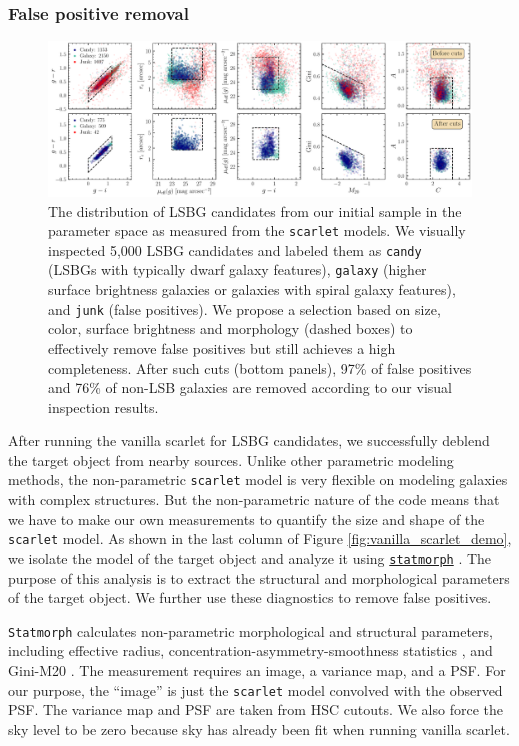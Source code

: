 \documentclass[twocolumn,astrosymb,twocolappendix]{aastex631}
\newcommand{\code}[1]{\texttt{#1}}
\begin{document}
\begin{CJK*}{UTF8}{gbsn}
\subsubsection{False positive removal}\label{sec:non-par-measurement}

\begin{figure}
	\vbox{
		\centering
		\includegraphics[width=1.0\linewidth]{deblending_cuts.pdf}
	}
	\caption{The distribution of LSBG candidates from our initial sample in the parameter space as measured from the \code{scarlet} models. We visually inspected 5,000 LSBG candidates and labeled them as \code{candy} (LSBGs with typically dwarf galaxy features), \code{galaxy} (higher surface brightness galaxies or galaxies with spiral galaxy features), and \code{junk} (false positives). We propose a selection based on size, color, surface brightness and morphology (dashed boxes) to effectively remove false positives but still achieves a high completeness. After such cuts (bottom panels), 97\% of false positives and 76\% of non-LSB galaxies are removed according to our visual inspection results. 
	}
	\label{fig:deblending_cuts}
\end{figure}

After running the vanilla scarlet for LSBG candidates, we successfully deblend the target object from nearby sources. Unlike other parametric modeling methods, the non-parametric \code{scarlet} model is very flexible on modeling galaxies with complex structures. But the non-parametric nature of the code means that we have to make our own measurements to quantify the size and shape of the \code{scarlet} model. As shown in the last column of Figure \ref{fig:vanilla_scarlet_demo}, we isolate the model of the target object and analyze it using \href{https://statmorph.readthedocs.io/en/latest/}{\code{statmorph}} \citep{statmorph}. The purpose of this analysis is to extract the structural and morphological parameters of the target object. We further use these diagnostics to remove false positives. 

\code{Statmorph} calculates non-parametric morphological and structural parameters, including effective radius, concentration-asymmetry-smoothness statistics \citep[CAS,][]{Conselice2003}, and Gini-M20 \citep{Abraham2003,Lotz2004}. The measurement requires an image, a variance map, and a PSF. For our purpose, the ``image'' is just the \code{scarlet} model convolved with the observed PSF. The variance map and PSF are taken from HSC cutouts. We also force the sky level to be zero because sky has already been fit when running vanilla scarlet. 


\end{CJK*}
\end{document}
